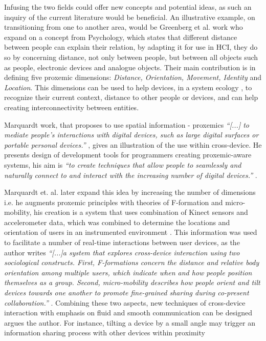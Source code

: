 Infusing the two fields could offer new concepts and potential ideas, as such an inquiry of the current literature would be beneficial. 
An illustrative example, on transitioning from one to another area, would be Greenberg et al. work \cite{Greenberg:2011} who expand on a concept from Psychology, which states that different distance between people can explain their relation, by adapting it for use in HCI, they do so by concerning distance, not only between people, but between all objects such as people, electronic devices and analogue objects. Their main contribution is in defining five proxemic dimensions: \emph{Distance, Orientation, Movement, Identity} and \emph{Location}. This dimensions can be used to help devices, in a system ecology , to recognize their current context, distance to other people or devices, and can help creating interconnectivity between entities. 

Marquardt work, that proposes to use spatial information - proxemics {\em``[...] to mediate people's interactions with digital devices, such as large digital surfaces or portable personal devices.''} \cite{Marquardt:2011}, gives an illustration of the use within cross-device. He presents design of development tools for programmers creating proxemic-aware systems, his aim is {\em``to create techniques that allow people to seamlessly and naturally connect to and interact with the increasing number of digital devices.''} \cite{Marquardt:2011}. 


Marquardt et. al. later expand this idea by increasing the number of dimensions i.e. he augments proxemic principles with theories of F-formation and micro-mobility, his creation is a system that uses combination of Kinect sensors and accelerometer data, which was combined to determine the locations and orientation of users in an instrumented environment . This information was used to facilitate a number of real-time interactions between user devices, as the author writes {\em``[...]a system that explores cross-device interaction using two sociological constructs. First, F-formations concern the distance and relative body orientation among multiple users, which indicate when and how people position themselves as a group. Second, micro-mobility describes how people orient and tilt devices towards one another to promote fine-grained sharing during co-present collaboration.''} \cite{Marquardt:2012}. Combining these two aspects, new techniques of cross-device interaction with emphasis on fluid and smooth communication can be designed argues the author. For instance, tilting a device by a small angle may trigger an information sharing process with other devices within proximity\\ 


